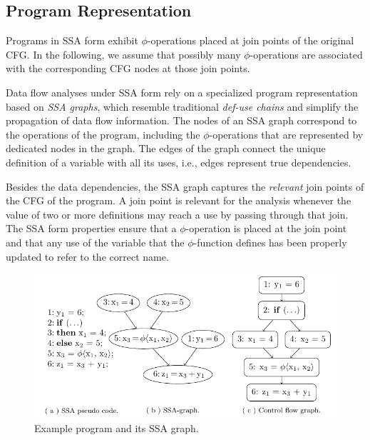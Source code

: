 \subsection{Program Representation}

Programs in SSA form exhibit $\phi$-operations placed at join
points of the original CFG. In the following, we assume that possibly many
$\phi$-operations are associated with the corresponding CFG nodes at those
join points.

Data flow analyses under SSA form rely on a specialized program representation
based on \emph{SSA graphs}, which resemble traditional \emph{def-use chains} and
simplify the propagation of data flow information. The nodes of an SSA graph
correspond to the operations of the program, including the 
$\phi$-operations that are represented by dedicated nodes in the graph. The
edges of the graph connect the unique definition of a variable with all its
uses, i.e., edges represent true dependencies.

Besides the data dependencies, the SSA graph captures the \emph{relevant} join 
points of the CFG of the program. A join point
is relevant for the analysis whenever the value of two or more definitions may
reach a use by passing through that join. The SSA form properties ensure that
a $\phi$-operation is placed at the join point and that any use of the variable
that the $\phi$-function defines has been properly updated to refer to the
correct name.

\begin{figure}[t]
  \includegraphics[trim=4.3mm 0 0 0]{ssa_graph}
  \caption{Example program and its SSA graph.}
  \label{novillo:fig:ssa_graph}
\end{figure}

